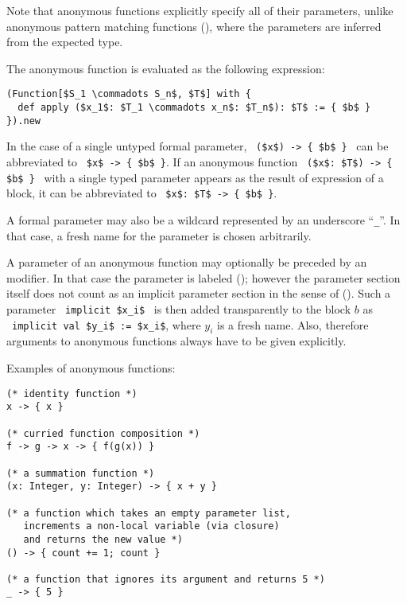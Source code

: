 Note that anonymous functions explicitly specify all of their parameters, unlike anonymous pattern matching functions (), where the parameters are inferred from the expected type. 

The anonymous function is evaluated as the following expression:
\begin{lstlisting}
(Function[$S_1 \commadots S_n$, $T$] with {
  def apply ($x_1$: $T_1 \commadots x_n$: $T_n$): $T$ := { $b$ }
}).new
\end{lstlisting}

In the case of a single untyped formal parameter, ~\lstinline!($x$) -> { $b$ }!~ can be abbreviated to ~\lstinline!$x$ -> { $b$ }!. If an anonymous function ~\lstinline!($x$: $T$) -> { $b$ }!~ with a single typed parameter appears as the result of expression of a block, it can be abbreviated to ~\lstinline!$x$: $T$ -> { $b$ }!.

A formal parameter may also be a wildcard represented by an underscore ``\lstinline!_!''. In that case, a fresh name for the parameter is chosen arbitrarily. 

A parameter of an anonymous function may optionally be preceded by an  modifier. In that case the parameter is labeled  (); however the parameter section itself does not count as an implicit parameter section in the sense of (). Such a parameter ~\lstinline!implicit $x_i$!~ is then added transparently to the block $b$ as ~\lstinline!implicit val $y_i$ := $x_i$!, where $y_i$ is a fresh name. Also, therefore arguments to anonymous functions always have to be given explicitly. 

\example Examples of anonymous functions:
\begin{lstlisting}
(* identity function *)
x -> { x }

(* curried function composition *)
f -> g -> x -> { f(g(x)) }

(* a summation function *)
(x: Integer, y: Integer) -> { x + y }

(* a function which takes an empty parameter list,
   increments a non-local variable (via closure)
   and returns the new value *)
() -> { count += 1; count }

(* a function that ignores its argument and returns 5 *)
_ -> { 5 }
\end{lstlisting}





